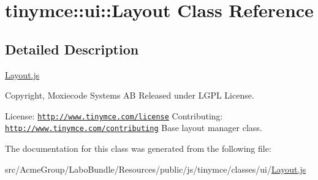 \hypertarget{classtinymce_1_1ui_1_1_layout}{\section{tinymce\+:\+:ui\+:\+:Layout Class Reference}
\label{classtinymce_1_1ui_1_1_layout}
}


\subsection{Detailed Description}
\hyperlink{_layout_8js}{Layout.\+js}

Copyright, Moxiecode Systems A\+B Released under L\+G\+P\+L License.

License\+: \href{http://www.tinymce.com/license}{\tt http\+://www.\+tinymce.\+com/license} Contributing\+: \href{http://www.tinymce.com/contributing}{\tt http\+://www.\+tinymce.\+com/contributing} Base layout manager class. 

The documentation for this class was generated from the following file\+:\begin{DoxyCompactItemize}
\item 
src/\+Acme\+Group/\+Labo\+Bundle/\+Resources/public/js/tinymce/classes/ui/\hyperlink{_layout_8js}{Layout.\+js}\end{DoxyCompactItemize}

